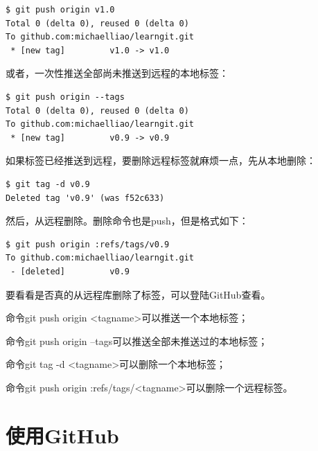 \begin{verbatim}
$ git push origin v1.0
Total 0 (delta 0), reused 0 (delta 0)
To github.com:michaelliao/learngit.git
 * [new tag]         v1.0 -> v1.0
\end{verbatim}

或者，一次性推送全部尚未推送到远程的本地标签：

\begin{verbatim}
$ git push origin --tags
Total 0 (delta 0), reused 0 (delta 0)
To github.com:michaelliao/learngit.git
 * [new tag]         v0.9 -> v0.9
\end{verbatim}

如果标签已经推送到远程，要删除远程标签就麻烦一点，先从本地删除：

\begin{verbatim}
$ git tag -d v0.9
Deleted tag 'v0.9' (was f52c633)
\end{verbatim}

然后，从远程删除。删除命令也是push，但是格式如下：

\begin{verbatim}
$ git push origin :refs/tags/v0.9
To github.com:michaelliao/learngit.git
 - [deleted]         v0.9
\end{verbatim}

要看看是否真的从远程库删除了标签，可以登陆GitHub查看。

\begin{tcolorbox}

命令git push origin <tagname>可以推送一个本地标签；

命令git push origin --tags可以推送全部未推送过的本地标签；

命令git tag -d <tagname>可以删除一个本地标签；

命令git push origin :refs/tags/<tagname>可以删除一个远程标签。
\end{tcolorbox}

\chapter{使用GitHub}


